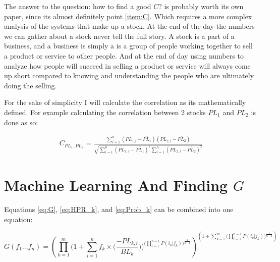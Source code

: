 \documentclass[12pt]{article}
\begin{document}
    The answer to the question: how to find a good \(C\)? is probably worth its own paper, since
    its almost definitely point \ref{item:C}. Which requires a more complex analysis of the systems
    that make up a stock. At the end of the day the numbers we can gather about a stock never
    tell the full story. A stock is a part of a business, and a business is simply a is a
    group of people working together to sell a product or service to other people.
    And at the end of day using numbers to analyze how people will succeed in selling
    a product or service will always come up short compared to knowing and understanding
    the people who are ultimately doing the selling.

    For the sake of simplicity I will calculate the correlation as its mathematically defined.
    For example calculating the correlation between 2 stocks \(PL_1\) and \(PL_2\) is
    done as so:

    \begin{align}
        C_{PL_1, PL_2} = 
        \frac{
            \displaystyle\sum^{n}_{i=1} (PL_{1, i} - \bar {PL_1})(PL_{2, i} - \bar {PL_2})
        }{
            \sqrt{
                \displaystyle\sum^{n}_{i=1}(PL_{1,i} - \bar {PL_1})^2 
                \displaystyle\sum^{n}_{i=1}(PL_{2,i} - \bar {PL_2})^2
            }
        }
        \label{eq:Correlation}
    \end{align}

\section{Machine Learning And Finding \(G\)}

    Equations \ref{eq:G}, \ref{eq:HPR_k}, and \ref{eq:Prob_k} can be combined into one equation:

    \begin{equation}\label{eq:FullG}
        G(f_1...f_n) = \left(
            \displaystyle\prod^{m}_{k=1} \Bigg(
                1 + \displaystyle\sum^{n}_{i=1} f_k \times \Big(
                    \frac{- PL_{k,i} }{BL_k}
                \Big) 
            \Bigg)^{\Bigg(
                \displaystyle\prod^{n - 1}_{i=1} P(i_k | j_k)
            \Bigg) ^ {\frac{1}{n - 1}}} 
        \right) ^ {
            \left( {1 \div {\displaystyle\sum^{m}_{k=1}
                \Bigg( 
                    \displaystyle\prod^{n - 1}_{i=1}  P(i_k | j_k)
                \Bigg) ^ {
                    \frac{1}{n - 1}}
                }
            }
        \right)}
    \end{equation}
\end{document}
